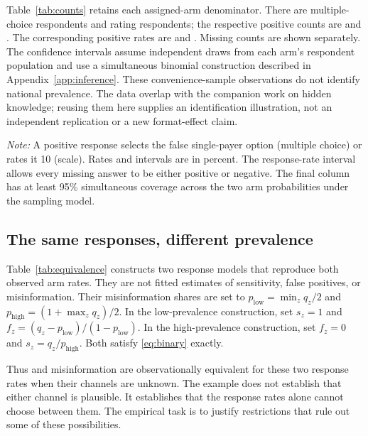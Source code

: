 \documentclass[11pt]{article}
\begin{document}
Table~\ref{tab:counts} retains each assigned-arm denominator. There are \idMcN{} multiple-choice respondents and \idScaleN{} rating respondents; the respective positive counts are \idMcPositive{} and \idScalePositive{}. The corresponding positive rates are \idMcRate{} and \idScaleRate{}. Missing counts are shown separately. The confidence intervals assume independent draws from each arm's respondent population and use a simultaneous binomial construction described in Appendix~\ref{app:inference}. These convenience-sample observations do not identify national prevalence. The data overlap with the companion work on hidden knowledge; reusing them here supplies an identification illustration, not an independent replication or a new format-effect claim.

\begin{table}[htbp]
\centering
\caption{Observed responses to the single-payer proposition}
\label{tab:counts}
\TableStyle

\begin{minipage}{\linewidth}
\footnotesize\emph{Note:} A positive response selects the false single-payer option (multiple choice) or rates it 10 (scale). Rates and intervals are in percent. The response-rate interval allows every missing answer to be either positive or negative. The final column has at least 95\% simultaneous coverage across the two arm probabilities under the sampling model.
\end{minipage}
\end{table}

\subsection{The same responses, different prevalence}

Table~\ref{tab:equivalence} constructs two response models that reproduce both observed arm rates. They are not fitted estimates of sensitivity, false positives, or misinformation. Their misinformation shares are set to $p_{\mathrm{low}}=\min_z q_z/2$ and $p_{\mathrm{high}}=(1+\max_z q_z)/2$. In the low-prevalence construction, set $s_z=1$ and $f_z=(q_z-p_{\mathrm{low}})/(1-p_{\mathrm{low}})$. In the high-prevalence construction, set $f_z=0$ and $s_z=q_z/p_{\mathrm{high}}$. Both satisfy \eqref{eq:binary} exactly.

Thus \idLowPrevalence{} and \idHighPrevalence{} misinformation are observationally equivalent for these two response rates when their channels are unknown. The example does not establish that either channel is plausible. It establishes that the response rates alone cannot choose between them. The empirical task is to justify restrictions that rule out some of these possibilities.
\end{document}
